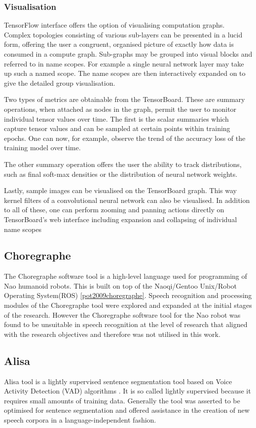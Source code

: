 \subsubsection{Visualisation}
TensorFlow interface offers the option of visualising computation graphs. Complex topologies consisting of various sub-layers can be presented in a lucid form, offering the user a congruent, organised picture of exactly how data is consumed in a compute graph. Sub-graphs may be grouped into visual blocks and referred to in name scopes.  For example a single neural network layer may take up such a named scope. The name scopes are then interactively expanded on to give the detailed group visualisation.

Two types of metrics are obtainable from the TensorBoard. These are summary operations, when attached as nodes in the graph, permit the user to monitor individual tensor values over time.   The first is the scalar summaries which capture tensor values and can be sampled at certain points within training epochs. One can now, for example, observe the trend of the accuracy loss of the training model over time.

The other summary operation offers the user the ability to track distributions, such as final soft-max densities or the distribution of neural network weights. 

Lastly, sample images can be visualised on the TensorBoard graph. This way kernel filters of a convolutional neural network can also be visualised.  In addition to all of these, one can perform zooming and panning actions directly on TensorBoard's web interface including expansion and collapsing of individual name scopes

\subsection{Choregraphe}
The Choregraphe software tool is a high-level language used for programming of Nao humanoid robots.  This is built on top of the Naoqi/Gentoo Unix/Robot Operating System(ROS) \ref{pot2009choregraphe}.  Speech recognition and processing modules of the Choregraphe tool were explored and expanded at the initial stages of the research.  However the Choregraphe software tool for the Nao robot was found to be unsuitable in speech recognition at the level of research that aligned with the research objectives and therefore was not utilised in this work.

\subsection{Alisa}\label{sec_c3_alisa}
Alisa tool is a lightly supervised sentence segmentation tool based on Voice Activity Detection (VAD) algorithms \citep{stan2016alisa}.  It is so called lightly supervised because it requires small amounts of training data.  Generally the tool was asserted to be optimised for sentence segmentation and offered assistance in the creation of new speech corpora in a language-independent fashion. 

